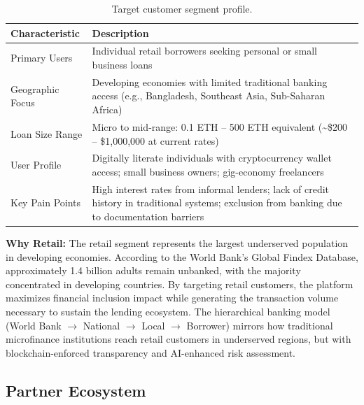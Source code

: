 \documentclass[11pt,a4paper]{article}
\newcommand{\tableheadfont}{\bfseries\small\color{PrimaryBlue}}
\newenvironment{moderntable}[1][H]{%
    \begin{table}[#1]\centering\small%
    \renewcommand{\arraystretch}{1.35}%
}{%
    \end{table}%
}
\begin{document}
\begin{moderntable}
\caption{Target customer segment profile.}
\begin{tabular}{@{} >{\raggedright}p{3.8cm} >{\raggedright\arraybackslash}p{8.2cm} @{}}
\toprule
\tableheadfont Characteristic & \tableheadfont Description \\
\midrule
\rowcolor{RowShade}
Primary Users & Individual retail borrowers seeking personal or small business loans \\
Geographic Focus & Developing economies with limited traditional banking access (e.g., Bangladesh, Southeast Asia, Sub-Saharan Africa) \\
\rowcolor{RowShade}
Loan Size Range & Micro to mid-range: 0.1 ETH -- 500 ETH equivalent (\textasciitilde\$200 -- \$1,000,000 at current rates) \\
User Profile & Digitally literate individuals with cryptocurrency wallet access; small business owners; gig-economy freelancers \\
\rowcolor{RowShade}
Key Pain Points & High interest rates from informal lenders; lack of credit history in traditional systems; exclusion from banking due to documentation barriers \\
\bottomrule
\end{tabular}
\end{moderntable}

\textbf{Why Retail:} The retail segment represents the largest underserved population in developing economies. According to the World Bank's Global Findex Database, approximately 1.4 billion adults remain unbanked, with the majority concentrated in developing countries. By targeting retail customers, the platform maximizes financial inclusion impact while generating the transaction volume necessary to sustain the lending ecosystem. The hierarchical banking model (World Bank $\to$ National $\to$ Local $\to$ Borrower) mirrors how traditional microfinance institutions reach retail customers in underserved regions, but with blockchain-enforced transparency and AI-enhanced risk assessment.

\subsection{Partner Ecosystem}
\end{document}

